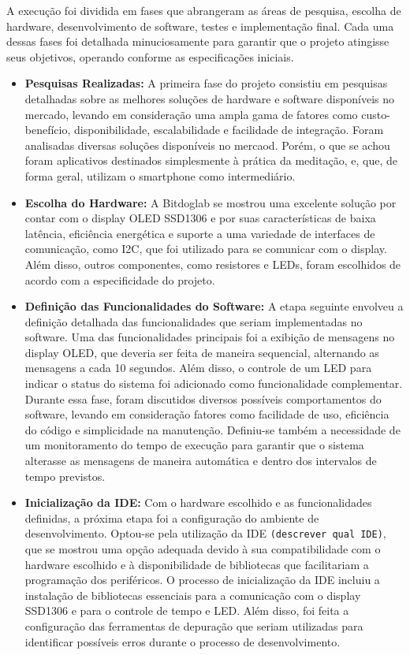 \documentclass{article}
\begin{document}
A execução foi dividida em fases que abrangeram as áreas de pesquisa, escolha de hardware, desenvolvimento de software, testes e implementação final. Cada uma dessas fases foi detalhada minuciosamente para garantir que o projeto atingisse seus objetivos, operando conforme as especificações iniciais.

\begin{itemize}
    \item \textbf{Pesquisas Realizadas:} A primeira fase do projeto consistiu em pesquisas detalhadas sobre as melhores soluções de hardware e software disponíveis no mercado, levando em consideração uma ampla gama de fatores como custo-benefício, disponibilidade, escalabilidade e facilidade de integração. Foram analisadas diversas soluções disponíveis no mercaod. Porém, o que se achou foram aplicativos destinados simplesmente à prática da meditação, e, que, de forma geral, utilizam o smartphone como intermediário.
    
    \item \textbf{Escolha do Hardware:} A Bitdoglab se mostrou uma excelente solução por contar com o display OLED SSD1306 e por suas características de baixa latência, eficiência energética e suporte a uma variedade de interfaces de comunicação, como I2C, que foi utilizado para se comunicar com o display. Além disso, outros componentes, como resistores e LEDs, foram escolhidos de acordo com a especificidade do projeto.
    
    \item \textbf{Definição das Funcionalidades do Software:} A etapa seguinte envolveu a definição detalhada das funcionalidades que seriam implementadas no software. Uma das funcionalidades principais foi a exibição de mensagens no display OLED, que deveria ser feita de maneira sequencial, alternando as mensagens a cada 10 segundos. Além disso, o controle de um LED para indicar o status do sistema foi adicionado como funcionalidade complementar. Durante essa fase, foram discutidos diversos possíveis comportamentos do software, levando em consideração fatores como facilidade de uso, eficiência do código e simplicidade na manutenção. Definiu-se também a necessidade de um monitoramento do tempo de execução para garantir que o sistema alterasse as mensagens de maneira automática e dentro dos intervalos de tempo previstos.
    
    \item \textbf{Inicialização da IDE:} Com o hardware escolhido e as funcionalidades definidas, a próxima etapa foi a configuração do ambiente de desenvolvimento. Optou-se pela utilização da IDE \texttt{(descrever qual IDE)}, que se mostrou uma opção adequada devido à sua compatibilidade com o hardware escolhido e à disponibilidade de bibliotecas que facilitariam a programação dos periféricos. O processo de inicialização da IDE incluiu a instalação de bibliotecas essenciais para a comunicação com o display SSD1306 e para o controle de tempo e LED. Além disso, foi feita a configuração das ferramentas de depuração que seriam utilizadas para identificar possíveis erros durante o processo de desenvolvimento.
    

\end{itemize}
\end{document}
